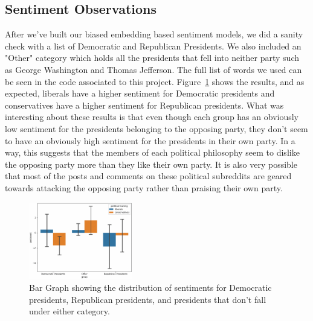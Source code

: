 \documentclass[conference]{IEEEtran}
\begin{document}
\subsection{Sentiment Observations}
After we've built our biased embedding based sentiment models, we did a sanity check with a list of Democratic and Republican Presidents. We also included an "Other" category which holds all the presidents that fell into neither party such as George Washington and Thomas Jefferson. The full list of words we used can be seen in the code associated to this project. Figure~\ref{fig:Embeddings2} shows the results, and as expected, liberals have a higher sentiment for Democratic presidents and conservatives have a higher sentiment for Republican presidents. What was interesting about these results is that even though each group has an obviously low sentiment for the presidents belonging to the opposing party, they don't seem to have an obviously high sentiment for the presidents in their own party. In a way, this suggests that the members of each political philosophy seem to dislike the opposing party more than they like their own party. It is also very possible that most of the posts and comments on these political subreddits are geared towards attacking the opposing party rather than praising their own party.

\begin{figure}[tb]
    \centering
    \includegraphics[width=0.4\textwidth]{Embeddings2.pdf}
    \vspace{-2mm}
    \caption{Bar Graph showing the distribution of sentiments for Democratic presidents, Republican presidents, and presidents that don't fall under either category.}
    \label{fig:Embeddings2}
    \vspace{-5mm}
\end{figure}
\end{document}
